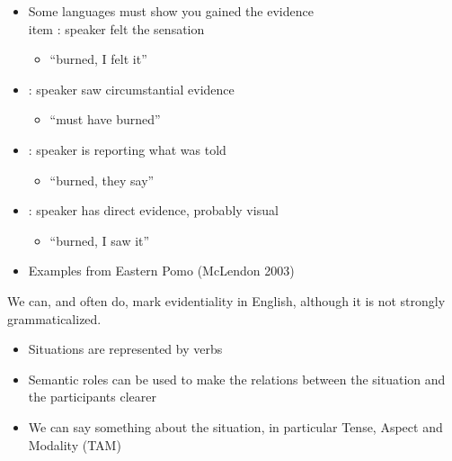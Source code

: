 \documentclass[a4paper,landscape,headrule,footrule,xetex]{foils}
\begin{document}
\begin{itemize}
\item  Some languages must show you gained the evidence
\\item  {}:  speaker felt the sensation
  \begin{itemize}
  \item {} ``burned, I felt it''
  \end{itemize}
\item  {}: speaker saw circumstantial evidence 
  \begin{itemize}
  \item  {}  ``must have burned''
  \end{itemize}
\item  {}:   speaker is reporting what was told
  \begin{itemize}
  \item  {} ``burned, they say''
  \end{itemize}
\item  {}:   speaker has direct evidence, probably visual 
  \begin{itemize}
  \item {} ``burned, I saw it''
  \end{itemize}
\item Examples from Eastern Pomo (McLendon 2003)
\end{itemize}


We can, and often do, mark evidentiality in English, although it is
not strongly grammaticalized.

\begin{exe}
\ex {}
\ex {}
\ex {}
\ex {}
\ex {}
\ex {}
\ex {}
\end{exe}





\begin{itemize}
\item Situations are represented by verbs
\item Semantic roles can be used to make the relations between the situation and the participants clearer
\item We can say something about the situation, in particular Tense, Aspect and Modality (TAM)
  
\end{itemize}

\small


\end{document}
